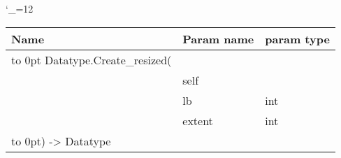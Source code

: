 \begingroup \catcode`\_=12 \tt
\begin{tabular}{lll}
\toprule
\textrm{Name}&\textrm{Param name}&\textrm{param type}\\
\midrule
\hbox to 0pt {Datatype.Create_resized(\hss}\\
& self\\
& lb & int\\
& extent & int\\
\hbox to 0pt{) -> Datatype\hss}\\
\bottomrule
\end{tabular}
\endgroup
